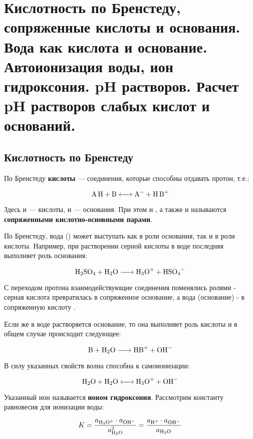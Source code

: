 \section{Кислотность по Бренстеду, сопряженные кислоты и основания. Вода как кислота и основание. Автоионизация воды, ион гидроксония. pH растворов. Расчет pH растворов слабых кислот и оснований.}

\subsection{Кислотность по Бренстеду}

По Бренстеду \textbf{кислоты} --- соединения, которые способны отдавать протон, т.е.:

\begin{equation}
	\ce{A H + B <-> A- + H B+}
\end{equation}

Здесь  и  --- кислоты,  и  --- основания. При этом  и , а также  и  называются \textbf{сопряженными кислотно-основными парами}.


По Бренстеду, вода () может выступать как в роли основания, так и в роли кислоты. Например, при растворении серной кислоты в воде последняя выполняет роль основания:

\begin{equation}
	\ce{H2SO4 + H2O -> H3O+ + HSO4-}
\end{equation}

С переходом протона взаимодействующие соединения поменялись ролями - серная кислота превратилась в сопряженное основание, а вода (основание) - в сопряженную кислоту .

Если же в воде растворяется основание, то она выполняет роль кислоты и в общем случае происходит следующее:

\begin{equation}
	\ce{B + H2O -> HB+ + OH-}
\end{equation}

В силу указанных свойств волна способна к самоионизации:

\begin{equation}
	\ce{H2O + H2O <-> H3O+ + OH-}
\end{equation}

Указанный ион  называется \textbf{ионом гидроксония}. Рассмотрим константу равновесия для ионизации воды:

\begin{equation}
	K = \frac{a_{\ce{H3O+}} \cdot a_{\ce{OH^-}}}{a^2_{\ce{H2O}}} = \frac{a_{\ce{H+}} \cdot a_{\ce{OH-}}}{a_{\ce{H2O}}}
\end{equation}

